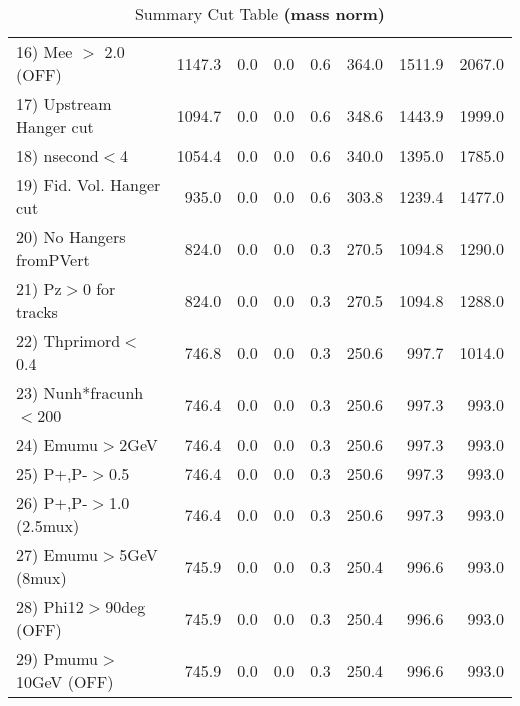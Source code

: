 \begin{table}[h!]
{{\begin{tabular}{||l||r|r|r|r|r||r||r||}
 16) Mee $>$ 2.0  (OFF)   &    1147.3 &       0.0 &       0.0 &       0.6 &     364.0 &    1511.9 &    2067.0 \\
 17) Upstream Hanger cut  &    1094.7 &       0.0 &       0.0 &       0.6 &     348.6 &    1443.9 &    1999.0 \\
 18) nsecond$<$4          &    1054.4 &       0.0 &       0.0 &       0.6 &     340.0 &    1395.0 &    1785.0 \\
 19) Fid. Vol. Hanger cut &     935.0 &       0.0 &       0.0 &       0.6 &     303.8 &    1239.4 &    1477.0 \\
 20) No Hangers fromPVert &     824.0 &       0.0 &       0.0 &       0.3 &     270.5 &    1094.8 &    1290.0 \\
 21) Pz$>$0 for tracks    &     824.0 &       0.0 &       0.0 &       0.3 &     270.5 &    1094.8 &    1288.0 \\
 22) Thprimord$<$0.4      &     746.8 &       0.0 &       0.0 &       0.3 &     250.6 &     997.7 &    1014.0 \\
 23) Nunh*fracunh$<$200   &     746.4 &       0.0 &       0.0 &       0.3 &     250.6 &     997.3 &     993.0 \\
 24) Emumu$>$2GeV         &     746.4 &       0.0 &       0.0 &       0.3 &     250.6 &     997.3 &     993.0 \\
 25) P+,P-$>$0.5          &     746.4 &       0.0 &       0.0 &       0.3 &     250.6 &     997.3 &     993.0 \\
 26) P+,P-$>$1.0 (2.5mux) &     746.4 &       0.0 &       0.0 &       0.3 &     250.6 &     997.3 &     993.0 \\
 27) Emumu$>$5GeV  (8mux) &     745.9 &       0.0 &       0.0 &       0.3 &     250.4 &     996.6 &     993.0 \\
 28) Phi12$>$90deg  (OFF) &     745.9 &       0.0 &       0.0 &       0.3 &     250.4 &     996.6 &     993.0 \\
 29) Pmumu$>$10GeV  (OFF) &     745.9 &       0.0 &       0.0 &       0.3 &     250.4 &     996.6 &     993.0 \\
 \hline
 \hline
 \end{tabular}
 \caption{Summary Cut Table \textbf{ (mass norm) }}
 \label{tab-sumcut}
 }}
 \end{table}
 \endinput
